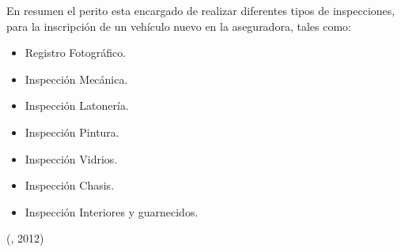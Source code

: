 En resumen el perito esta encargado de realizar diferentes tipos de inspecciones, para la inscripción de un vehículo nuevo en la aseguradora, tales como:
\begin{itemize}

	\item Registro Fotográfico.

	\item Inspección Mecánica.

	\item Inspección Latonería.

	\item Inspección Pintura.

	\item Inspección Vidrios.

	\item Inspección Chasis.

	\item Inspección Interiores y guarnecidos.

\end{itemize}

(\citet{peritoIVbib}, 2012)


\setlength{\parskip}{0mm}
